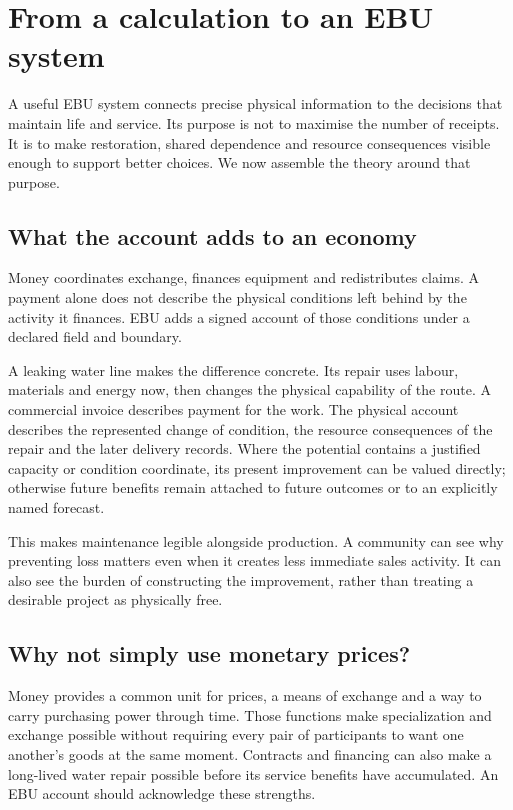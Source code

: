 \chapter{From a calculation to an EBU system}\label{ch:system-design}

A useful EBU system connects precise physical information to the decisions that maintain life and service. Its purpose is not to maximise the number of receipts. It is to make restoration, shared dependence and resource consequences visible enough to support better choices. We now assemble the theory around that purpose.

\section{What the account adds to an economy}
Money coordinates exchange, finances equipment and redistributes claims. A payment alone does not describe the physical conditions left behind by the activity it finances. EBU adds a signed account of those conditions under a declared field and boundary.

A leaking water line makes the difference concrete. Its repair uses labour, materials and energy now, then changes the physical capability of the route. A commercial invoice describes payment for the work. The physical account describes the represented change of condition, the resource consequences of the repair and the later delivery records. Where the potential contains a justified capacity or condition coordinate, its present improvement can be valued directly; otherwise future benefits remain attached to future outcomes or to an explicitly named forecast.

This makes maintenance legible alongside production. A community can see why preventing loss matters even when it creates less immediate sales activity. It can also see the burden of constructing the improvement, rather than treating a desirable project as physically free.

\section{Why not simply use monetary prices?}
Money provides a common unit for prices, a means of exchange and a way to carry purchasing power through time. Those functions make specialization and exchange possible without requiring every pair of participants to want one another's goods at the same moment.\cite{intro-money-functions} Contracts and financing can also make a long-lived water repair possible before its service benefits have accumulated. An EBU account should acknowledge these strengths.

